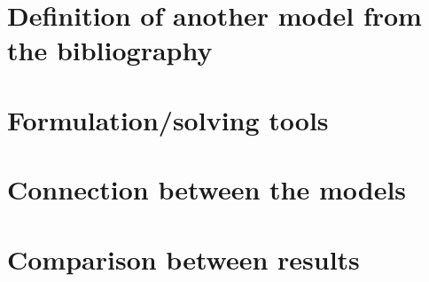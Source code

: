 \section{Definition of another model from the bibliography}
\section{Formulation/solving tools}
\section{Connection between the models}
\section{Comparison between results}
